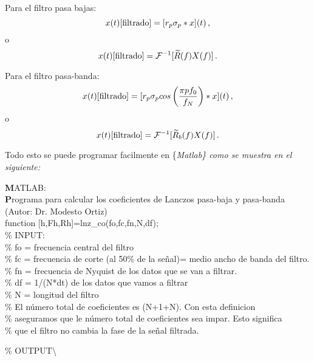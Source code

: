 \documentclass[
]{agujournal2019}
\begin{document}
Para el filtro pasa bajas:
\[x(t)[{\rm filtrado}]=[r_p \sigma_p * x](t)\,,\] o
\[x(t)[{\rm filtrado}]={\cal F}^{-1}[\widetilde{R}(f)X(f)]\,.\]

Para el filtro pasa-banda:
\[x(t)[{\rm filtrado}]=[r_p \sigma_p cos\left( \frac{\pi p f_0}{f_N}\right)*x](t)\,,\]
o \[x(t)[{\rm filtrado}]={\cal F}^{-1}[\widetilde{R}_b(f)X(f)]\,.\]

Todo esto se puede programar facilmente en \{\it Matlab\} como se
muestra en el siguiente:

\begin{framed}
{\noindent \textbf MATLAB:}\\
{\textbf Programa para calcular los coeficientes de Lanczos pasa-baja y pasa-banda (Autor: Dr. Modesto Ortiz)}\\
{\noindent}function [h,Fh,Rh]=lnz\_co(fo,fc,fn,N,df);\\
\% INPUT:\\
\% fo = frecuencia central del filtro\\
\% fc = frecuencia de corte (al 50\% de la señal)= medio ancho de banda del filtro.\\
\% fn = frecuencia de Nyquist de los datos que se van a filtrar.\\
\% df = 1/(N*dt) de los datos que vamos a filtrar\\
\% N  = longitud del filtro\\
\% El número total de coeficientes es (N+1+N). Con esta definicion\\
\% aseguramos que le número total de coeficientes sea impar. Esto significa\\
\% que el filtro no cambia la fase de la señal filtrada.\\
\end{framed}

\% OUTPUT\textbackslash{}
\end{document}
